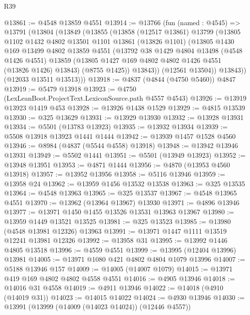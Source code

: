\begin{lexlean}{R39}
\begin{coremodule}
@13861 := @4548 @13859 @4551
@13914 := @13766
    (fun (named : @4545) =>
    @13791
      (@13804
        (@13849
          (@13855
            (@13858
              (@12517 @13861)
              @13799
              (@13805
                @1102
                @1432
                @4802
                @13501
                @1101
                @13861
                (@13826 @1101)
                (@13805
                  @1430
                  @169
                  @13499
                  @4802
                  @13859
                  @4551
                  (@13792
                    @38
                    @1429
                    @4804
                    @13498
                    (@4548 @1426 @4551)
                    @13859
                    (@13805 @1427 @169 @4802 @4802 @1426 @4551 (@13826 @1426) @13843)
                    (@8755 @1425))
                  @13843))
              (@12561 @13504))
            @13843))
        (@12033 @13511 @13513)))
@13918 := @4837 (@4844 (@4750 @5460)) @4847
@13919 := @5479 @13918
@13923 := @4750 (LexLeanBoot.ProjectText.LexiconSource.path @4557 @4543)
@13926 := @13919 @13923 @1419 @453
@13928 := @13926 @1438 @1529
@13929 := @4815 @13539
@13930 := @325 @13629
@13931 := @13929 @13930
@13932 := @13928 @13931
@13934 := @5501 (@13783 @13923)
@13935 := @13932 @13934
@13939 := @5508 @13918 @13923 @1441 @1444
@13942 := @13939 @1457 @1528 @4560
@13946 := @8984 (@4837 (@5544 @4558) @13918)
@13948 := @13942 @13946 @13931
@13949 := @5502 @1441
@13951 := @5501 (@13949 @13923)
@13952 := @13948 @13951
@13953 := @4871 @1444
@13956 := @4870 (@13953 @4560 @13918)
@13957 := @13952 @13956
@13958 := @5116 @13946
@13959 := @13958 @24
@13962 := @13959 @1456 @13532 @13538
@13963 := @325 @13535
@13964 := @4548 @13963
@13965 := @325 @13537
@13967 := @4548 @13965 @4551
@13970 := @13962 (@13964 @13967) @13930
@13971 := @4896 @13946
@13977 := @13971 @1450 @1455 @13526 @13531 @13963 @13967
@13980 := @13959 @1449 @13521 @13525
@13981 := @325 @13523
@13985 := @13980 (@4548 @13981 @12326) @13963
@13991 := @13971 @1447 @1111 @13519 @12241 @13981 @12326
@13992 := @13958 @31
@13995 := @13992 @1446 @4805 @13518
@13996 := @4559 @4551
@13999 := @13995 (@12404 @13996) @13981
@14005 := @13971 @1080 @421 @4802 @4804 @1079 @13996
@14007 := @5188 @13946 @157
@14009 := @14005 (@14007 @1079)
@14015 := @13971 @419 @169 @4802 @4802 @4558 @4551
@14016 := @4905 @13946
@14018 := @14016 @31 @4558
@14019 := @4911 @13946
@14022 := @14018 (@4910 (@14019 @31))
@14023 := @14015 @14022
@14024 := @4930 @13946
@14030 := @13991 (@13999 (@14009 (@14023 @14024)) (@12446 @4557))

\end{coremodule}
\end{lexlean}
